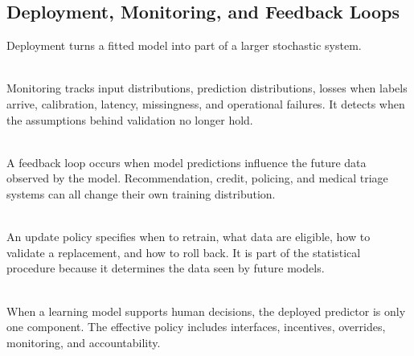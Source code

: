 \subsection{Deployment, Monitoring, and Feedback Loops}

Deployment turns a fitted model into part of a larger stochastic system.

\begin{definition} \label{def:sl-monitoring} \\
Monitoring tracks input distributions, prediction distributions, losses when labels arrive, calibration, latency, missingness, and operational failures.  It detects when the assumptions behind validation no longer hold.
\end{definition}

\begin{definition} \label{def:sl-feedback-loop} \\
A feedback loop occurs when model predictions influence the future data observed by the model.  Recommendation, credit, policing, and medical triage systems can all change their own training distribution.
\end{definition}

\begin{method} \label{method:sl-model-update-policy} \\
An update policy specifies when to retrain, what data are eligible, how to validate a replacement, and how to roll back.  It is part of the statistical procedure because it determines the data seen by future models.
\end{method}

\begin{remark} \label{rem:sl-human-system-boundary} \\
When a learning model supports human decisions, the deployed predictor is only one component.  The effective policy includes interfaces, incentives, overrides, monitoring, and accountability.
\end{remark}
